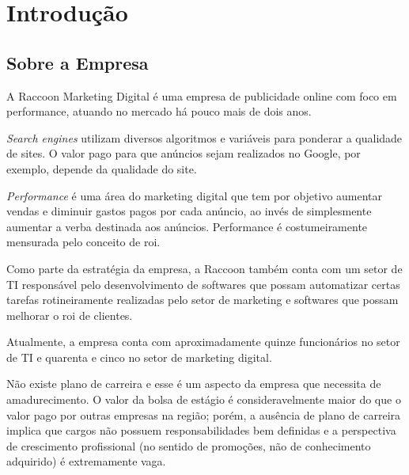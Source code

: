 \chapter{Introdução}
\label{chap:intro}


\section{Sobre a Empresa}

A Raccoon Marketing Digital\cite{Raccoon} é uma empresa de publicidade online
com foco em performance, atuando no mercado
há pouco mais de dois anos.

\emph{Search engines} utilizam diversos algoritmos e variáveis para
ponderar a qualidade de sites. O valor pago para que anúncios
sejam realizados no Google, por exemplo, depende da qualidade do
site.

\emph{Performance} é uma área do marketing digital que tem por objetivo
aumentar vendas e diminuir gastos pagos por cada anúncio, ao
invés de simplesmente aumentar a verba destinada aos anúncios.
Performance é costumeiramente mensurada pelo conceito de
\gls{roi}.

Como parte da estratégia da empresa, a Raccoon também conta com
um setor de TI responsável pelo desenvolvimento de softwares que
possam automatizar certas tarefas rotineiramente realizadas pelo setor 
de marketing e softwares que possam melhorar o \gls{roi} de clientes.

Atualmente, a empresa conta com aproximadamente quinze
funcionários no setor de TI e quarenta e cinco no setor de
marketing digital.

Não existe plano de carreira e esse é um aspecto da empresa que
necessita de amadurecimento. O valor da bolsa de estágio é
consideravelmente maior do que o valor pago por outras empresas na
região; porém, a ausência de plano de carreira implica que
cargos não possuem responsabilidades bem definidas e a
perspectiva de crescimento profissional (no sentido de promoções,
não de conhecimento adquirido) é extremamente vaga.



